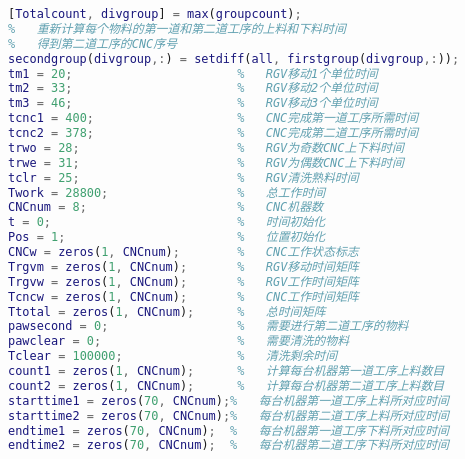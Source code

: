 \documentclass[no-math,withoutpreface,bwprint]{cumcmthesis} %
\numberwithin{equation}{section}
\numberwithin{figure}{section}
\numberwithin{table}{section}
\begin{document}
\begin{lstlisting}[language=matlab]
%   找出能生产出最大物料的组合方式
[Totalcount, divgroup] = max(groupcount);
%   重新计算每个物料的第一道和第二道工序的上料和下料时间
%   得到第二道工序的CNC序号
secondgroup(divgroup,:) = setdiff(all, firstgroup(divgroup,:));
tm1 = 20;                       %   RGV移动1个单位时间
tm2 = 33;                       %   RGV移动2个单位时间
tm3 = 46;                       %   RGV移动3个单位时间
tcnc1 = 400;                    %   CNC完成第一道工序所需时间
tcnc2 = 378;                    %   CNC完成第二道工序所需时间
trwo = 28;                      %   RGV为奇数CNC上下料时间
trwe = 31;                      %   RGV为偶数CNC上下料时间
tclr = 25;                      %   RGV清洗熟料时间
Twork = 28800;                  %   总工作时间
CNCnum = 8;                     %   CNC机器数
t = 0;                          %   时间初始化
Pos = 1;                        %   位置初始化
CNCw = zeros(1, CNCnum);        %   CNC工作状态标志
Trgvm = zeros(1, CNCnum);      	%   RGV移动时间矩阵
Trgvw = zeros(1, CNCnum);       %   RGV工作时间矩阵
Tcncw = zeros(1, CNCnum);       %   CNC工作时间矩阵
Ttotal = zeros(1, CNCnum);      %   总时间矩阵
pawsecond = 0;                  %   需要进行第二道工序的物料
pawclear = 0;                   %   需要清洗的物料
Tclear = 100000;                %   清洗剩余时间
count1 = zeros(1, CNCnum);      %   计算每台机器第一道工序上料数目
count2 = zeros(1, CNCnum);      %   计算每台机器第二道工序上料数目
starttime1 = zeros(70, CNCnum);%   每台机器第一道工序上料所对应时间
starttime2 = zeros(70, CNCnum);%   每台机器第二道工序上料所对应时间
endtime1 = zeros(70, CNCnum);  %   每台机器第一道工序下料所对应时间
endtime2 = zeros(70, CNCnum);  %   每台机器第二道工序下料所对应时间


\end{lstlisting}
\end{document}
